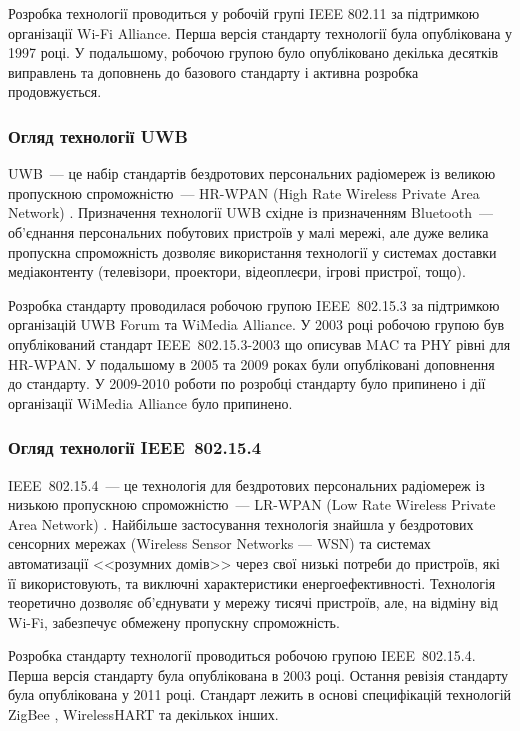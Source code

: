\documentclass[a4paper,ukrainian,utf8,nocolumnsxix,nocolumnxxxii,nocolumnxxxi,floatsection,equationsection]{eskdtext}
\renewcommand\paragraph{\subsubsection}
\newcommand{\iee}[0]{IEEE~802.15.4\xspace}
\newcommand{\engtxt}[1]{\foreignlanguage{english}{#1}}
\begin{document}
Розробка технології проводиться у робочій групі IEEE 802.11 за підтримкою організації Wi-Fi Alliance. Перша версія стандарту технології була опублікована у 1997 році. У подальшому, робочою групою було опубліковано декілька десятків виправлень та доповнень до базового стандарту і активна розробка продовжується.

\paragraph{Огляд технології UWB} %
\label{par:uwb}

UWB~--- це набір стандартів бездротових персональних радіомереж із великою пропускною спроможністю~--- HR-WPAN (High Rate Wireless Private Area Network) \cite{comparative:wireless:protocols}. Призначення технології UWB східне із призначенням Bluetooth~--- об'єднання  персональних побутових пристроїв у малі мережі, але дуже велика пропускна спроможність дозволяє використання технології у системах доставки медіаконтенту (телевізори, проектори, відеоплеєри, ігрові пристрої, тощо).

Розробка стандарту проводилася робочою групою IEEE~802.15.3 за підтримкою організацій UWB Forum та WiMedia Alliance. У 2003 році робочою групою був опублікований стандарт IEEE~802.15.3-2003 що описував MAC та PHY рівні для HR-WPAN. У подальшому в 2005 та 2009 роках були опубліковані доповнення до стандарту. У 2009-2010 роботи по розробці стандарту було припинено і дії організації WiMedia Alliance було припинено.

\paragraph{Огляд технології \iee}
\label{par:iee}

\iee~--- це технологія для бездротових персональних радіомереж із низькою пропускною спроможністю~--- LR-WPAN (\engtxt{Low Rate Wireless Private Area Network}) \cite{comparative:wireless:protocols}. Найбільше застосування технологія знайшла у бездротових сенсорних мережах (Wireless Sensor Networks --- WSN) та системах автоматизації <<розумних домів>> через свої низькі потреби до пристроїв, які її використовують, та виключні характеристики енергоефективності. Технологія теоретично дозволяє об'єднувати у мережу тисячі пристроїв, але, на відміну від Wi-Fi, забезпечує обмежену пропускну спроможність. 

Розробка стандарту технології проводиться робочою групою \iee. Перша версія стандарту була опублікована в 2003 році. Остання ревізія стандарту була опублікована у 2011 році. Стандарт лежить в основі специфікацій технологій ZigBee \cite{zigbee:core:spec}, WirelessHART \cite{wihart:zigbee:comparison} та декількох інших.
\end{document}
